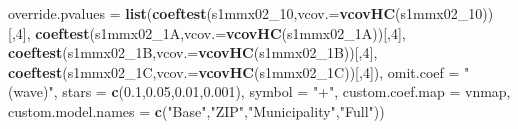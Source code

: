 \documentclass[
]{article}
\newenvironment{Shaded}{\begin{snugshade}}{\end{snugshade}}
\newcommand{\DataTypeTok}[1]{\textcolor[rgb]{0.13,0.29,0.53}{#1}}
\newcommand{\DecValTok}[1]{\textcolor[rgb]{0.00,0.00,0.81}{#1}}
\newcommand{\FloatTok}[1]{\textcolor[rgb]{0.00,0.00,0.81}{#1}}
\newcommand{\KeywordTok}[1]{\textcolor[rgb]{0.13,0.29,0.53}{\textbf{#1}}}
\newcommand{\NormalTok}[1]{#1}
\newcommand{\StringTok}[1]{\textcolor[rgb]{0.31,0.60,0.02}{#1}}
\begin{document}
\begin{Shaded}
\begin{Highlighting}[]
          \DataTypeTok{override.pvalues =} \KeywordTok{list}\NormalTok{(}\KeywordTok{coeftest}\NormalTok{(s1mmx02_}\DecValTok{10}\NormalTok{,}\DataTypeTok{vcov.=}\KeywordTok{vcovHC}\NormalTok{(s1mmx02_}\DecValTok{10}\NormalTok{))[,}\DecValTok{4}\NormalTok{],}
                                  \KeywordTok{coeftest}\NormalTok{(s1mmx02_1A,}\DataTypeTok{vcov.=}\KeywordTok{vcovHC}\NormalTok{(s1mmx02_1A))[,}\DecValTok{4}\NormalTok{],}
                                  \KeywordTok{coeftest}\NormalTok{(s1mmx02_1B,}\DataTypeTok{vcov.=}\KeywordTok{vcovHC}\NormalTok{(s1mmx02_1B))[,}\DecValTok{4}\NormalTok{],}
                                  \KeywordTok{coeftest}\NormalTok{(s1mmx02_1C,}\DataTypeTok{vcov.=}\KeywordTok{vcovHC}\NormalTok{(s1mmx02_1C))[,}\DecValTok{4}\NormalTok{]),}
          \DataTypeTok{omit.coef =} \StringTok{"(wave)"}\NormalTok{, }\DataTypeTok{stars =} \KeywordTok{c}\NormalTok{(}\FloatTok{0.1}\NormalTok{,}\FloatTok{0.05}\NormalTok{,}\FloatTok{0.01}\NormalTok{,}\FloatTok{0.001}\NormalTok{), }\DataTypeTok{symbol =} \StringTok{"+"}\NormalTok{,}
          \DataTypeTok{custom.coef.map =}\NormalTok{ vnmap, }
          \DataTypeTok{custom.model.names =} \KeywordTok{c}\NormalTok{(}\StringTok{"Base"}\NormalTok{,}\StringTok{"ZIP"}\NormalTok{,}\StringTok{"Municipality"}\NormalTok{,}\StringTok{"Full"}\NormalTok{))}
\end{Highlighting}
\end{Shaded}
\end{document}
